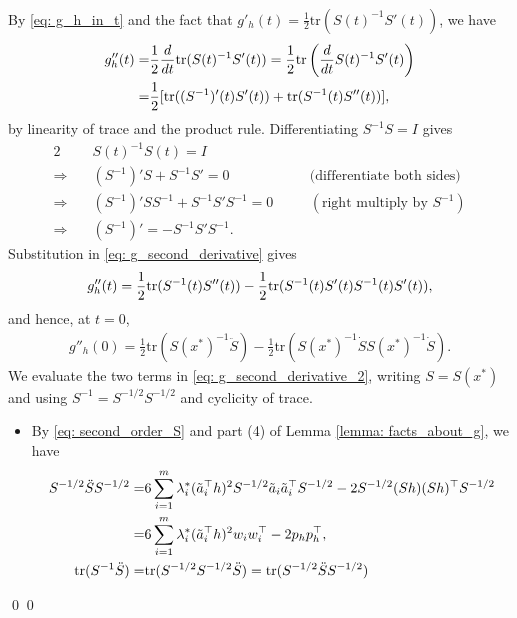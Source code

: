 \documentclass[smallextended]{svjour3}
\let\springerproof\proof
\let\endspringerproof\endproof
\renewenvironment{proof}{\springerproof}{%
  \ifhmode\qed\else\leavevmode\qed\fi\endspringerproof}
\newcommand{\tr}{\mathrm{tr}}
\begin{document}
\begin{proof}
\begin{itemize}
\begin{align}
        \end{align}
    \end{itemize}
    By \eqref{eq: g_h_in_t} and the fact that $g'_h(t) = \frac{1}{2}\tr(S(t)^{-1}S'(t))$, we have
    \begin{align}
     g_h''(t) = & \frac{1}{2}\frac{d}{dt}\tr(S(t)^{-1}S'(t)) = \frac{1}{2} \tr\left(\frac{d}{dt} S(t)^{-1}S'(t)\right) \notag \\
        = & \frac{1}{2} [\tr((S^{-1})'(t)S'(t)) +  \tr(S^{-1}(t)S''(t))], \label{eq: g_second_derivative}
    \end{align}
    by linearity of trace and the product rule. Differentiating $S^{-1}S=I$ gives
    \begin{alignat*}{2}
        & S(t)^{-1} S(t) = I \quad &&   \\
        \Rightarrow\quad  & (S^{-1})'S + S^{-1}S' = 0 \quad && \text{(differentiate both sides)}\\
        \Rightarrow \quad & (S^{-1})'S S^{-1}+ S^{-1}S'S^{-1}  = 0 \quad && (\text{right multiply by $S^{-1}$}) \\
        \Rightarrow \quad & (S^{-1})' = -S^{-1}S'S^{-1}.
    \end{alignat*}
    Substitution in \eqref{eq: g_second_derivative} gives
    \begin{align}
        g''_h(t)
        = \frac{1}{2}\tr(S^{-1}(t)S''(t)) - \frac{1}{2}\tr(S^{-1}(t)S'(t)S^{-1}(t)S'(t)),\notag
    \end{align}
    and hence, at $t=0$,
    \begin{align}\label{eq: g_second_derivative_2}
        g''_h(0) = \frac{1}2\tr(S(x^*)^{-1} \ddot{S}) - \frac{1}{2}\tr(S(x^*)^{-1}\dot{S}S(x^*)^{-1}\dot{S}).
    \end{align}
    We evaluate the two terms in \eqref{eq: g_second_derivative_2}, writing
    $S=S(x^*)$ and using $S^{-1}=S^{-1/2}S^{-1/2}$ and cyclicity of trace.
    \begin{itemize}
        \item By \eqref{eq: second_order_S} and part (4) of Lemma \ref{lemma: facts_about_g}, we have
        \begin{align}
            S^{-1/2}\ddot{S} S^{-1/2} =& 6 \sum_{i=1}^m \lambda^*_i (\tilde{a}_i^\top h)^2 S^{-1/2} \tilde{a}_i\tilde{a}_i^\top S^{-1/2} - 2S^{-1/2}(Sh)(Sh)^\top S^{-1/2} \notag \\
            = &  6 \sum_{i=1}^m \lambda^*_i (\tilde{a}_i^\top h)^2 w_iw_i^\top - 2p_hp_h^\top  \notag, \\
            \tr(S^{-1}\ddot{S}) = & \tr(S^{-1/2}S^{-1/2}\ddot{S} ) = \tr(S^{-1/2}\ddot{S} S^{-1/2}) \notag \\

\end{align}
\end{itemize}
\end{proof}
\end{document}
